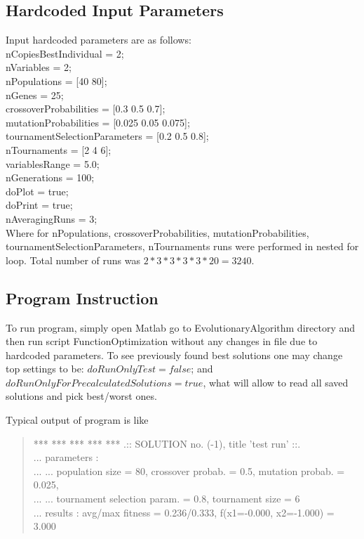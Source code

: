\documentclass[main.tex]{subfiles}
\begin{document}
\subsection{Hardcoded Input Parameters}

Input hardcoded parameters are as follows:\\
nCopiesBestIndividual = 2;\\
nVariables = 2;\\%
nPopulations = [40 80];\\ %
nGenes = 25;\\ %
crossoverProbabilities = [0.3 0.5 0.7];\\
mutationProbabilities = [0.025 0.05 0.075];\\
tournamentSelectionParameters = [0.2 0.5 0.8];\\
nTournaments = [2 4 6];\\
variablesRange = 5.0;\\
nGenerations = 100;\\
doPlot = true;\\
doPrint = true;\\
nAveragingRuns = 3;\\

Where for nPopulations, crossoverProbabilities, mutationProbabilities, tournamentSelectionParameters, nTournaments runs were performed in nested for loop. Total number of runs was $2*3*3*3*3*20 = 3240$.

\subsection{Program Instruction}

To run program, simply open Matlab go to EvolutionaryAlgorithm directory and then run script FunctionOptimization without any changes in file due to hardcoded parameters. To see previously found best solutions one may change top settings to be: $doRunOnlyTest=false$; and $doRunOnlyForPrecalculatedSolutions=true$, what will allow to read all saved solutions and pick best/worst ones.

Typical output of program is like


\begin{quote}
*** *** *** *** ***  .:: SOLUTION no. (-1), title 'test run' ::. \\
... parameters : \\
... ... population size = 80, crossover probab. = 0.5, mutation probab. = 0.025,\\
... ... tournament selection param. = 0.8, tournament size = 6\\
... results : avg/max fitness = 0.236/0.333, f(x1=-0.000, x2=-1.000) = 3.000\\
\end{quote}
\end{document}
